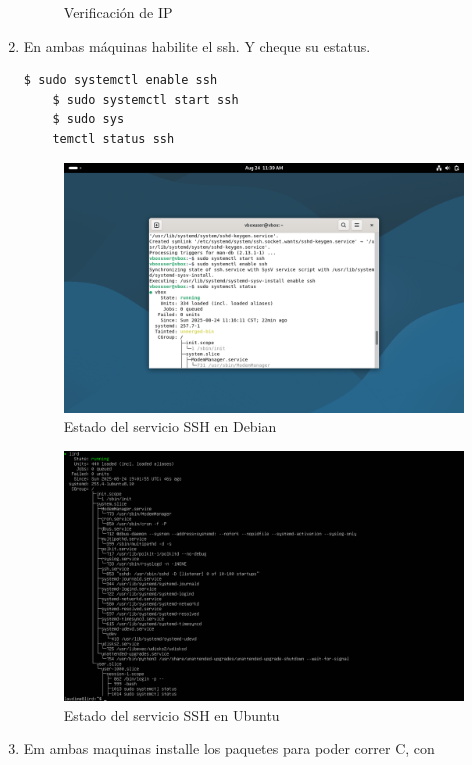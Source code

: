 \documentclass{article}
\begin{document}
\begin{enumerate}
\begin{figure}
        \caption{Verificación de IP}
    \end{figure}
    \item En ambas máquinas habilite el ssh. Y cheque su estatus.
    \begin{lstlisting}[language=bash]
    $ sudo systemctl enable ssh
    $ sudo systemctl start ssh
    $ sudo sys
    temctl status ssh
    \end{lstlisting}
    \begin{figure}
        \includegraphics[width=\linewidth]{./images/ssh-status.png}
        \caption{Estado del servicio SSH en Debian}
    \end{figure}
    \begin{figure}
        \includegraphics[width=\linewidth]{./images/ssh-status-ubuntu.png}
        \caption{Estado del servicio SSH en Ubuntu}
    \end{figure}
    \item Em ambas maquinas installe los paquetes para poder correr C, con 

\end{enumerate}
\end{document}
